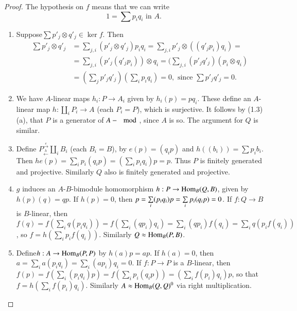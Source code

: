 \begin{proof}
The hypothesis on $f$ means that we can write 
$$
1 = \sum p_i q_i \text{ in }A. 
$$
\begin{enumerate}[(1)]
\item Suppose\pageoriginale $\sum p'_j \otimes q'_j \in \ker f$. Then  
\begin{align*}
\sum p'_j \otimes q'_j & = \sum_{j , i} (p'_j\otimes q'_j) p_iq_i =
\sum_{j,i} p'_j \otimes ((q'_j p_i) q_i)=\\
& = \sum_{j , i} (p'_j(q'_jp_i)) \otimes q_i =  (\sum_{j, i} (p'_j q'_j)
(p_i \otimes q_i ) \\ 
& = (\sum_j p'_j q'_j)(\sum_i p_i q_i) = 0, \text{ since } \sum p'_j
q'_j = 0.    
 \end{align*} 

 \item We have $A$-linear maps $h_i : P \to A_i$ given by $h_i (p) =
   pq_i $. These define an $A$-linear map $h : \coprod\limits_i P_i
   \to A$ (each $P_i = P$), which is surjective. It follows by (1.3)
   (a), that $P$ is a generator of $A-\mod$, since $A$ is so. The
   argument for $Q$ is similar.  

 \item Define $ P^{\xrightarrow{e}}_{\xleftarrow{h}} \coprod
   \limits_i B_i$ (each $B_i = B$), by $e(p) = (q_i p)$ and $h((b_i))
   = \sum p_i b_i $. Then $he(p) = \sum_i p_i (q_i p) = (\sum\limits_i
   p_i q_i )p = p $. Thus $P$ is finitely generated and
   projective. Similarly $Q$ also is finitely generated and
   projective.  

 \item $g$ induces an $A$-$B$-bimodule homomorphism $h: P \to \operatorname{Hom}_B
   (Q, B)$, given by $h(p)(q) = qp$. If $h(p) = 0$, then  $p =
   \sum\limits_i (p_i q_i) p = \sum\limits_i p_i\break (q_i p) = 0$. If $f :
   Q \to B$ is $B$-linear, then $f(q) = f(\sum\limits_i q(p_i q_i)) =
   f(\sum\limits_i (qp_i)q_i) = \sum_i (qp_i)f (q_i) =
   \sum\limits_{i}q(p_if (q_i))$, so $f = h (\sum\limits_i p_i f
   (q_i))$. Similarly $Q \approx \operatorname{Hom}_B (P,B)$.  

 \item Define\pageoriginale $h : A \to \operatorname{Hom}_B (P, P)$ by $h(a)p =
   ap$. If $h(a) = 
   0$, then $a = \sum\limits_i a(p_i q_i ) = \sum\limits_{i} (ap_i
   )q_i = 0$. If $f : P \to P $ is a $B$-linear, then $f(p) = f
   (\sum\limits_i (p_i q_i)p) = f(\sum\limits_i p_i (q_i p)) =
   (\sum\limits_i f(p_i) q_i)p$, so
   that $f = h (\sum\limits_i f(p_i)q_i)$. Similarly $A \approx \operatorname{Hom}_B
   (Q, Q)^0$ via right multiplication.  
\end{enumerate}
\end{proof}


